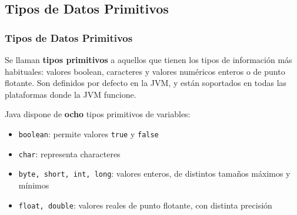 \documentclass{beamer}
\begin{document}
\subsection{Tipos de Datos Primitivos}

\begin{frame}
  \frametitle{Tipos de Datos Primitivos}
  
  \begin{block}{}
    Se llaman \textbf{tipos primitivos} a aquellos que tienen los
    tipos de información más habituales: valores boolean, caracteres y
    valores numéricos enteros o de punto flotante. Son definidos por
    defecto en la JVM, y están soportados en todas las plataformas
    donde la JVM funcione.
  \end{block}
\end{frame}

\begin{frame}
  Java dispone de \textbf{ocho} tipos primitivos de variables:

  \begin{itemize}
  \item \texttt{boolean}: permite valores \texttt{true} y \texttt{false}
  \item \texttt{char}: representa characteres
  \item \texttt{byte, short, int, long}: valores enteros, de distintos
    tamaños máximos y mínimos    
  \item \texttt{float, double}: valores reales de punto flotante, con
    distinta precisión
  \end{itemize}

\end{frame}
\end{document}
